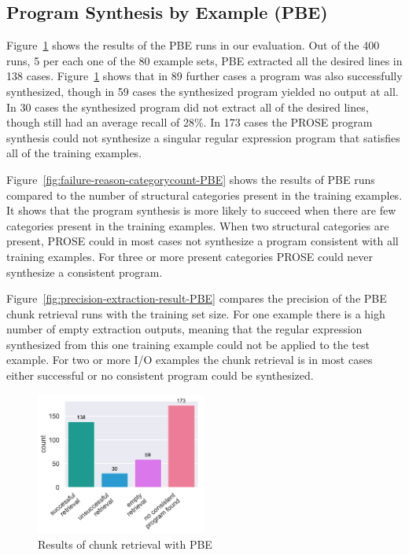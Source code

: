 \documentclass[\myrootdir/main.tex]{subfiles}
\begin{document}
\subsection{Program Synthesis by Example (PBE)}
Figure~\ref{fig:failure-reason-PBE} shows the results of the PBE runs in our evaluation.
Out of the 400 runs, 5 per each one of the 80 example sets, PBE extracted all the desired lines in 138 cases.
Figure~\ref{fig:failure-reason-PBE} shows that in 89 further cases a program was also successfully synthesized, though in 59 cases the synthesized program yielded no output at all.
In 30 cases the synthesized program did not extract all of the desired lines, though still had an average recall of 28\%.
In 173 cases the PROSE program synthesis could not synthesize a singular regular expression program that satisfies all of the training examples.

Figure~\ref{fig:failure-reason-categorycount-PBE} shows the results of PBE runs compared to the number of structural categories present in the training examples.
It shows that the program synthesis is more likely to succeed when there are few categories present in the training examples.
When two structural categories are present, PROSE could in most cases not synthesize a program consistent with all training examples.
For three or more present categories PROSE could never synthesize a consistent program.

Figure~\ref{fig:precision-extraction-result-PBE} compares the precision of the PBE chunk retrieval runs with the training set size.
For one example there is a high number of empty extraction outputs, meaning that the regular expression synthesized from this one training example could not be applied to the test example.
For two or more I/O examples the chunk retrieval is in most cases either successful or no consistent program could be synthesized.

\begin{figure}[htbp]
		\centering
		\includegraphics[width=0.5\textwidth, clip]{img/big-study/failure-reason-PBE.pdf}
		\caption{Results of chunk retrieval with PBE}
		\label{fig:failure-reason-PBE}
\end{figure}
\end{document}
